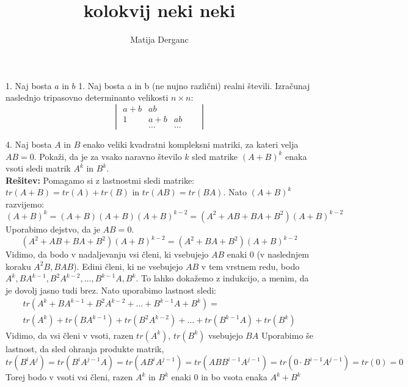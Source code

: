\documentclass[a4paper,12pt]{article}
\title{kolokvij neki neki}
\author{Matija Derganc}
\begin{document}
1. Naj bosta $a$ in $b$ 1. Naj bosta a in b (ne nujno različni) realni števili. Izračunaj naslednjo tripasovno
determinanto velikosti $n \times n$:
$$
\begin{vmatrix}
    a+b & ab & & & \\
    1 & a+b & ab \\
      & \dots & \dots
\end{vmatrix}	$$
     

\pagebreak


4. Naj bosta $A$ in $B$ enako veliki kvadratni kompleksni matriki, za kateri velja $AB=0$. 
Pokaži, da je za vsako naravno število $k$ sled matrike $(A+B)^k$ enaka vsoti sledi matrik $A^k$ in $B^k$.\\
\textbf{Rešitev:}
Pomagamo si z lastnostmi sledi matrike: \\$tr(A+B) = tr(A) + tr(B)$ in $tr(AB) = tr(BA)$. Nato $(A+B)^k$ razvijemo:
\[(A+B)^k = (A+B)(A+B)(A+B)^{k-2} = (A^2 + AB + BA + B^2)(A+B)^{k-2}\] 
Uporabimo dejstvo, da je $AB = 0$.
\[(A^2 + AB + BA + B^2)(A+B)^{k-2} = (A^2 + BA + B^2)(A+B)^{k-2} \]
Vidimo, da bodo v nadaljevanju vsi členi, ki vsebujejo $AB$ enaki 0 (v naslednjem koraku $A^2B, BAB$). Edini členi, ki ne vsebujejo $AB$ v tem vrstnem redu,
bodo $A^k, BA^{k-1}, B^2A^{k-2}, \dots, B^{k-1}A, B^k $. To lahko dokažemo z indukcijo, a menim, da je dovolj jasno tudi brez.
Nato uporabimo lastnost sledi:
\begin{align*}tr(A^k+BA^{k-1}+B^2A^{k-2}+\dots+B^{k-1}A+B^k) =  \\
tr(A^k)+ tr(BA^{k-1}) +tr(B^2A^{k-2})+ \dots +tr(B^{k-1}A)+tr(B^k) 
\end{align*}
Vidimo, da vsi členi v vsoti, razen $tr(A^k)$, $tr(B^k)$ vsebujejo $BA$ Uporabimo še lastnost, da sled ohranja produkte matrik,
\[ tr(B^iA^j)= tr(B^{i}A^{j-1}A) = tr(AB^iA^{j-1} ) = tr(ABB^{i-1}A^{j-1})=tr(0 \cdot B^{i-1}A^{j-1})=tr(0)=0\] 
Torej bodo v vsoti vsi členi, razen $A^k$ in $B^k$ enaki 0 in bo vsota enaka $A^k + B^k$
\end{document}
